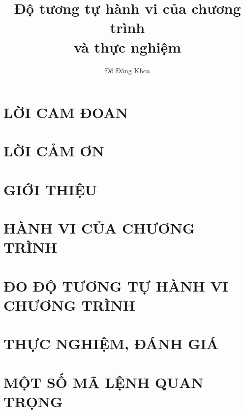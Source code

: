 \documentclass[12pt,a4paper,openany,oneside]{memoir} %
\title{Độ tương tự hành vi của chương trình \\ và thực nghiệm}
\author{Đỗ Đăng Khoa}
\begin{document}
	
\fontsize{14pt}{14pt}\selectfont \baselineskip 0.65cm
\thispagestyle{empty}



\chapter*{LỜI CAM ĐOAN}


\chapter*{LỜI CẢM ƠN}


\newpage
\tableofcontents


\newpage

\listoffigures
\newpage

\lstlistoflistings


\chapter{GIỚI THIỆU}
\label{chap:intro}


\chapter{HÀNH VI CỦA CHƯƠNG TRÌNH}
\label{chap:behaviors}


\chapter{ĐO ĐỘ TƯƠNG TỰ HÀNH VI CHƯƠNG TRÌNH}
\label{chap:method}


\chapter{THỰC NGHIỆM, ĐÁNH GIÁ}
\label{chap:results}





\appendix



\chapter{MỘT SỐ MÃ LỆNH QUAN TRỌNG}

\end{document}
